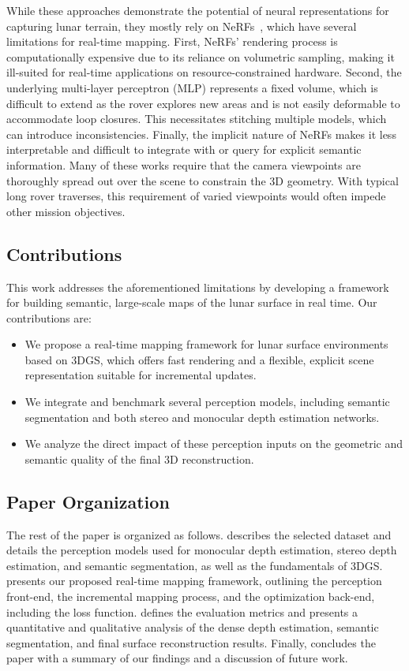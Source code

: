 While these approaches demonstrate the potential of neural representations for capturing lunar terrain, they mostly rely on NeRFs~\cite{mildenhall_nerf_2021}, which have several limitations for real-time mapping. First, NeRFs' rendering process is computationally expensive due to its reliance on volumetric sampling, making it ill-suited for real-time applications on resource-constrained hardware. Second, the underlying multi-layer perceptron (MLP) represents a fixed volume, which is difficult to extend as the rover explores new areas and is not easily deformable to accommodate loop closures. This necessitates stitching multiple models, which can introduce inconsistencies. Finally, the implicit nature of NeRFs makes it less interpretable and difficult to integrate with or query for explicit semantic information. Many of these works require that the camera viewpoints are thoroughly spread out over the scene to constrain the 3D geometry. With typical long rover traverses, this requirement of varied viewpoints would often impede other mission objectives.

\subsection{Contributions}
This work addresses the aforementioned limitations by developing a framework for building semantic, large-scale maps of the lunar surface in real time. Our contributions are:
\begin{itemize}
	\item We propose a real-time mapping framework for lunar surface environments based on 3DGS, which offers fast rendering and a flexible, explicit scene representation suitable for incremental updates.
	\item We integrate and benchmark several perception models, including semantic segmentation and both stereo and monocular depth estimation networks.
	\item We analyze the direct impact of these perception inputs on the geometric and semantic quality of the final 3D reconstruction.
\end{itemize}


\subsection{Paper Organization}
The rest of the paper is organized as follows.  describes the selected dataset and details the perception models used for monocular depth estimation, stereo depth estimation, and semantic segmentation, as well as the fundamentals of 3DGS.  presents our proposed real-time mapping framework, outlining the perception front-end, the incremental mapping process, and the optimization back-end, including the loss function.  defines the evaluation metrics and presents a quantitative and qualitative analysis of the dense depth estimation, semantic segmentation, and final surface reconstruction results. Finally,  concludes the paper with a summary of our findings and a discussion of future work.

